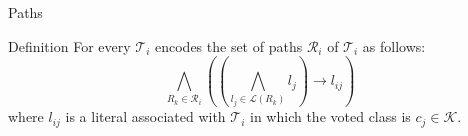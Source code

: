 \begin{frame}{Paths}
    \begin{block}{Definition}
        For every $\mathcal{T}_{i}$ encodes the set of paths $\mathcal{R}_{i}$ of $\mathcal{T}_{i}$ as follows:
        \begin{equation*}
        \bigwedge_{R_{k} \in \mathcal{R}_{i}} \left( \left( \bigwedge_{l_{j} \in \mathcal{L}(R_{k})} l_{j} \right) \rightarrow l_{ij} \right)
        \end{equation*}
        where $l_{ij}$ is a literal associated with $\mathcal{T}_{i}$ in which the voted class is $c_{j} \in \mathcal{K}$.
    \end{block}
\end{frame}
